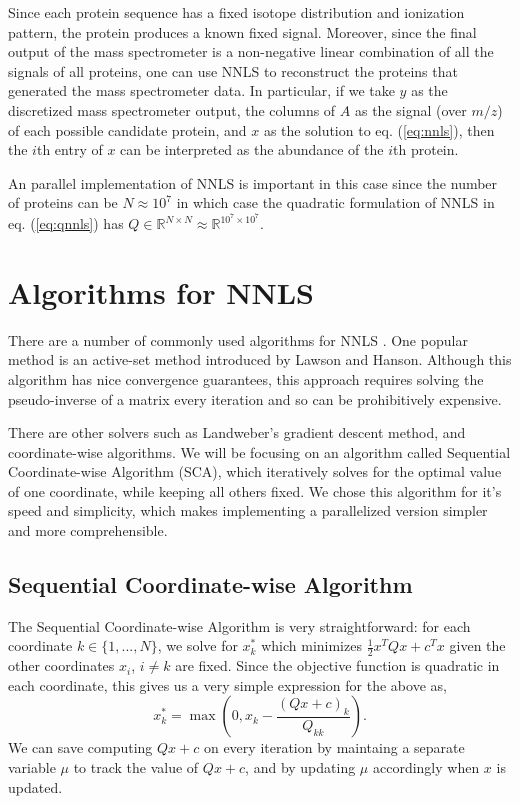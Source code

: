 \documentclass{article}
\begin{document}
Since each protein sequence has a fixed isotope distribution and ionization pattern, the protein produces a known fixed signal. Moreover, since the final output of the mass spectrometer is a non-negative linear combination of all the signals of all proteins, one can use NNLS to reconstruct the proteins that generated the mass spectrometer data. In particular, if we take $y$ as the discretized mass spectrometer output, the columns of $A$ as the signal (over $m/z$) of each possible candidate protein, and $x$ as the solution to eq. (\ref{eq:nnls}), then the $i$th entry of $x$ can be interpreted as the abundance of the $i$th protein.

An parallel implementation of NNLS is important in this case since the number of proteins can be $N \approx 10^7$ in which case the quadratic formulation of NNLS in eq. (\ref{eq:qnnls}) has $Q \in \mathbb R^{N \times N} \approx \mathbb R^{10^7 \times 10^7}$.

\section{Algorithms for NNLS}
There are a number of commonly used algorithms for NNLS \cite{}. One popular method is an active-set method introduced by Lawson and Hanson. Although this algorithm has nice convergence guarantees, this approach requires solving the pseudo-inverse of a matrix every iteration \cite{} and so can be prohibitively expensive.

There are other solvers such as Landweber's gradient descent method, and coordinate-wise algorithms. We will be focusing on an algorithm called Sequential Coordinate-wise Algorithm (SCA), which iteratively solves for the optimal value of one coordinate, while keeping all others fixed. We chose this algorithm for it's speed and simplicity, which makes implementing a parallelized version simpler and more comprehensible.

\subsection{Sequential Coordinate-wise Algorithm}
The Sequential Coordinate-wise Algorithm is very straightforward: for each coordinate $k \in \{1,...,N\}$, we solve for $x_k^*$ which minimizes $\frac12 x^T Q x + c^T x$ given the other coordinates $x_i$, $i \neq k$ are fixed. Since the objective function is quadratic in each coordinate, this gives us a very simple expression for the above as,
\begin{equation}\label{eq:sca_solve}
    x_k^* = \max\left( 0, x_k - \frac{(Qx + c)_k}{Q_{kk}}\right).
\end{equation}
We can save computing $Qx+c$ on every iteration by maintaing a separate variable $\mu$ to track the value of $Qx+c$, and by updating $\mu$ accordingly when $x$ is updated.
\end{document}
